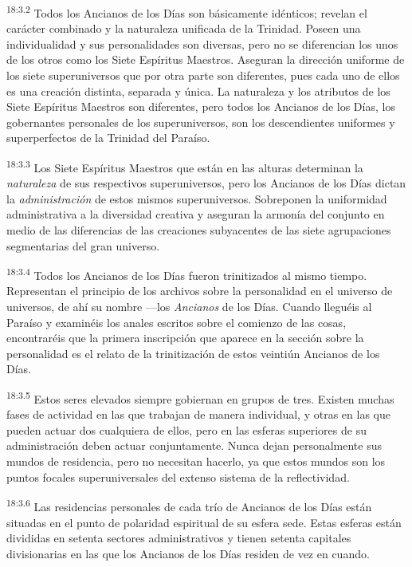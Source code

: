 \par
\textsuperscript{18:3.2} Todos los Ancianos de los Días son básicamente idénticos; revelan el carácter combinado y la naturaleza unificada de la Trinidad. Poseen una individualidad y sus personalidades son diversas, pero no se diferencian los unos de los otros como los Siete Espíritus Maestros. Aseguran la dirección uniforme de los siete superuniversos que por otra parte son diferentes, pues cada uno de ellos es una creación distinta, separada y única. La naturaleza y los atributos de los Siete Espíritus Maestros son diferentes, pero todos los Ancianos de los Días, los gobernantes personales de los superuniversos, son los descendientes uniformes y superperfectos de la Trinidad del Paraíso.

\par
\textsuperscript{18:3.3} Los Siete Espíritus Maestros que están en las alturas determinan la \textit{naturaleza} de sus respectivos superuniversos, pero los Ancianos de los Días dictan la \textit{administración} de estos mismos superuniversos. Sobreponen la uniformidad administrativa a la diversidad creativa y aseguran la armonía del conjunto en medio de las diferencias de las creaciones subyacentes de las siete agrupaciones segmentarias del gran universo.

\par
\textsuperscript{18:3.4} Todos los Ancianos de los Días fueron trinitizados al mismo tiempo. Representan el principio de los archivos sobre la personalidad en el universo de universos, de ahí su nombre ---los \textit{Ancianos} de los Días. Cuando lleguéis al Paraíso y examinéis los anales escritos sobre el comienzo de las cosas, encontraréis que la primera inscripción que aparece en la sección sobre la personalidad es el relato de la trinitización de estos veintiún Ancianos de los Días.

\par
\textsuperscript{18:3.5} Estos seres elevados siempre gobiernan en grupos de tres. Existen muchas fases de actividad en las que trabajan de manera individual, y otras en las que pueden actuar dos cualquiera de ellos, pero en las esferas superiores de su administración deben actuar conjuntamente. Nunca dejan personalmente sus mundos de residencia, pero no necesitan hacerlo, ya que estos mundos son los puntos focales superuniversales del extenso sistema de la reflectividad.

\par
\textsuperscript{18:3.6} Las residencias personales de cada trío de Ancianos de los Días están situadas en el punto de polaridad espiritual de su esfera sede. Estas esferas están divididas en setenta sectores administrativos y tienen setenta capitales divisionarias en las que los Ancianos de los Días residen de vez en cuando.

